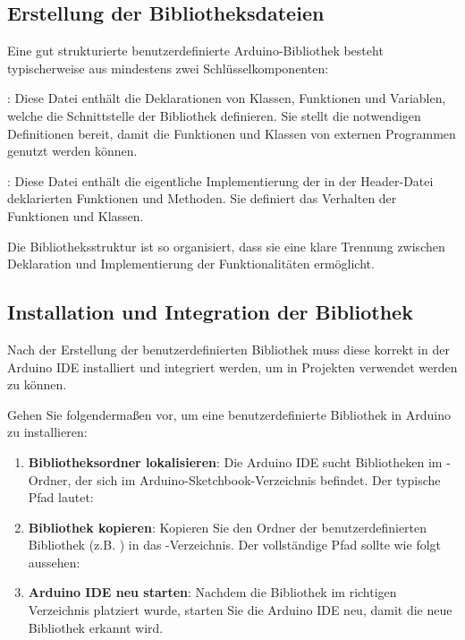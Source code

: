 \subsection{Erstellung der Bibliotheksdateien}

Eine gut strukturierte benutzerdefinierte Arduino-Bibliothek besteht typischerweise aus mindestens zwei Schlüsselkomponenten:

: Diese Datei enthält die Deklarationen von Klassen, Funktionen und Variablen, welche die Schnittstelle der Bibliothek definieren. Sie stellt die notwendigen Definitionen bereit, damit die Funktionen und Klassen von externen Programmen genutzt werden können.

: Diese Datei enthält die eigentliche Implementierung der in der Header-Datei deklarierten Funktionen und Methoden. Sie definiert das Verhalten der Funktionen und Klassen.

Die Bibliotheksstruktur ist so organisiert, dass sie eine klare Trennung zwischen Deklaration und Implementierung der Funktionalitäten ermöglicht.


\subsection{Installation und Integration der Bibliothek}

Nach der Erstellung der benutzerdefinierten Bibliothek muss diese korrekt in der Arduino IDE installiert und integriert werden, um in Projekten verwendet werden zu können.

Gehen Sie folgendermaßen vor, um eine benutzerdefinierte Bibliothek in Arduino zu installieren:

\begin{enumerate}
	\item \textbf{Bibliotheksordner lokalisieren}: Die Arduino IDE sucht Bibliotheken im -Ordner, der sich im Arduino-Sketchbook-Verzeichnis befindet. Der typische Pfad lautet:
	
	\medskip
	
	{\small{}}
	
	\item \textbf{Bibliothek kopieren}: Kopieren Sie den Ordner der benutzerdefinierten Bibliothek (z.B. ) in das -Verzeichnis. Der vollständige Pfad sollte wie folgt aussehen:
	
	\medskip
	
	{\small{}}
	
	\item \textbf{Arduino IDE neu starten}: Nachdem die Bibliothek im richtigen Verzeichnis platziert wurde, starten Sie die Arduino IDE neu, damit die neue Bibliothek erkannt wird.
	
\end{enumerate}

